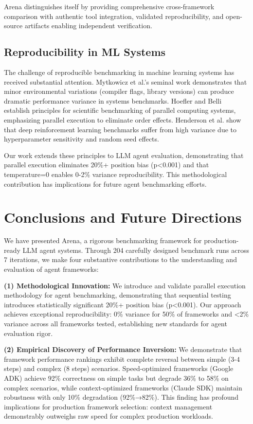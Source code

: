 \documentclass[sigconf,nonacm]{acmart}
\begin{document}
Arena distinguishes itself by providing comprehensive cross-framework comparison with authentic tool integration, validated reproducibility, and open-source artifacts enabling independent verification.

\subsection{Reproducibility in ML Systems}

The challenge of reproducible benchmarking in machine learning systems has received substantial attention. Mytkowicz et al.'s seminal work \cite{mytkowicz2009producing} demonstrates that minor environmental variations (compiler flags, library versions) can produce dramatic performance variance in systems benchmarks. Hoefler and Belli \cite{hoefler2015scientific} establish principles for scientific benchmarking of parallel computing systems, emphasizing parallel execution to eliminate order effects. Henderson et al. \cite{henderson2018deep} show that deep reinforcement learning benchmarks suffer from high variance due to hyperparameter sensitivity and random seed effects.

Our work extends these principles to LLM agent evaluation, demonstrating that parallel execution eliminates 20\%+ position bias (p<0.001) and that temperature=0 enables 0-2\% variance reproducibility. This methodological contribution has implications for future agent benchmarking efforts.

\section{Conclusions and Future Directions}

We have presented Arena, a rigorous benchmarking framework for production-ready LLM agent systems. Through 204 carefully designed benchmark runs across 7 iterations, we make four substantive contributions to the understanding and evaluation of agent frameworks:

\textbf{(1) Methodological Innovation:} We introduce and validate parallel execution methodology for agent benchmarking, demonstrating that sequential testing introduces statistically significant 20\%+ position bias (p<0.001). Our approach achieves exceptional reproducibility: 0\% variance for 50\% of frameworks and <2\% variance across all frameworks tested, establishing new standards for agent evaluation rigor.

\textbf{(2) Empirical Discovery of Performance Inversion:} We demonstrate that framework performance rankings exhibit complete reversal between simple (3-4 steps) and complex (8 steps) scenarios. Speed-optimized frameworks (Google ADK) achieve 92\% correctness on simple tasks but degrade 36\% to 58\% on complex scenarios, while context-optimized frameworks (Claude SDK) maintain robustness with only 10\% degradation (92\%→82\%). This finding has profound implications for production framework selection: context management demonstrably outweighs raw speed for complex production workloads.
\end{document}
